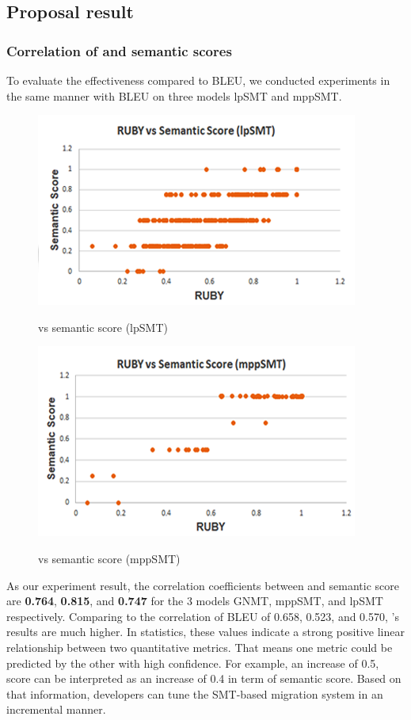\subsection{Proposal result}
\subsubsection{Correlation of {\model} and semantic scores}
To evaluate the effectiveness {\model} compared to BLEU, we conducted experiments 
in the same manner with BLEU on three models lpSMT and mppSMT. 

\begin{figure}[t]
\caption{{\model} vs semantic score (lpSMT)}
\centering
\includegraphics{img/rubyvssem_lpSMT.png}
\label{fig:RubySemlpSMT}
\end{figure}

\begin{figure}[t]
\caption{{\model} vs semantic score (mppSMT)}
\centering
\includegraphics{img/rubyvssem_mppSMT.png}
\label{fig:RubySemMppSMT}
\end{figure}

As our experiment result, the correlation coefficients between {\model} and
semantic score are \textbf{0.764}, \textbf{0.815}, and \textbf{0.747} for the 3 models GNMT, mppSMT, and lpSMT  respectively. Comparing to the correlation of BLEU of 0.658, 0.523, and 0.570, {\model}'s results are much higher. 
In statistics, 
these values indicate a strong positive linear relationship between two 
quantitative metrics. That means one metric could be predicted by the other 
with high confidence. For example, an increase of 0.5, {\model} score can be 
interpreted as an increase of 0.4 in term of semantic score. Based on that 
information, developers can tune the SMT-based migration system in an incremental manner.

